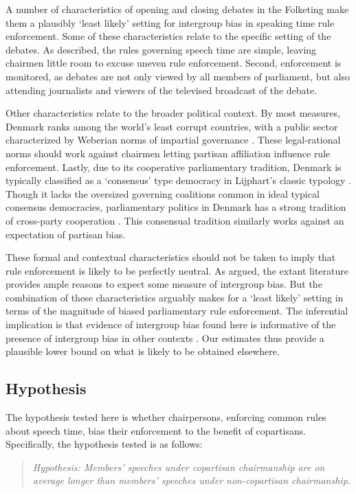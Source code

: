 \documentclass[12pt,a4paper]{article}
\begin{document}
A number of characteristics of opening and closing debates in the Folketing make them a plausibly `least likely' setting for intergroup bias in speaking time rule enforcement. Some of these characteristics relate to the specific setting of the debates. As described, the rules governing speech time are simple, leaving chairmen little room to excuse uneven rule enforcement. Second, enforcement is monitored, as debates are not only viewed by all members of parliament, but also attending journalists and viewers of the televised broadcast of the debate.

Other characteristics relate to the broader political context. By most measures, Denmark ranks among the world's least corrupt countries, with a public sector characterized by Weberian norms of impartial governance \citep{Treisman2000}. These legal-rational norms should work against chairmen letting partisan affiliation influence rule enforcement. Lastly, due to its cooperative parliamentary tradition, Denmark is typically classified as a `consensus' type democracy in Lijphart's classic typology \citep{Lijphart1999,Esaiasson2000}. Though it lacks the oversized governing coalitions common in ideal typical consensus democracies, parliamentary politics in Denmark has a strong tradition of cross-party cooperation \cite{Green-Pedersen2005}. This consensual tradition similarly works against an expectation of partisan bias.

These formal and contextual characteristics should not be taken to imply that rule enforcement is likely to be perfectly neutral. As argued, the extant literature provides ample reasons to expect some measure of intergroup bias. But the combination of these characteristics arguably makes for a `least likely' setting in terms of the magnitude of biased parliamentary rule enforcement. The inferential implication is that evidence of intergroup bias found here is informative of the presence of intergroup bias in other contexts \citep{Levy2008}. Our estimates thus provide a plausible lower bound on what is likely to be obtained elsewhere.

\subsection{Hypothesis}
The hypothesis tested here is whether chairpersons, enforcing common rules about speech time, bias their enforcement to the benefit of copartisans. Specifically, the hypothesis tested is as follows:

\begin{quote}
\textit{Hypothesis: Members' speeches under copartisan chairmanship are on average longer than members' speeches under non-copartisan chairmanship.}
\end{quote}
\end{document}
